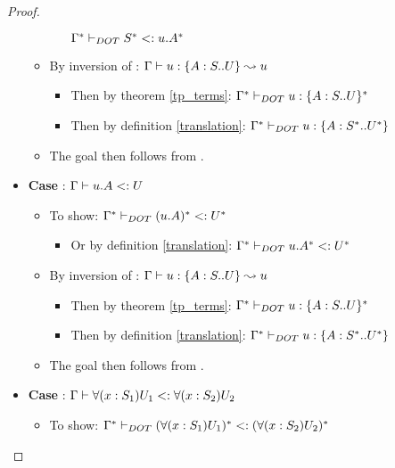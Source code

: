 \begin{proof}
\begin{itemize}
\begin{itemize}
\begin{itemize}
                    $\Gamma^{*} \vdash_{DOT} S^{*} <: u.A^{*}$
            \end{itemize}
            \item By inversion of :
                $\Gamma \vdash u: \{A : S .. U\} \leadsto u$
            \begin{itemize}
                \item Then by theorem \ref{tp_terms}:
                    $\Gamma^{*} \vdash_{DOT} u: \{A : S .. U\}^{*}$
                \item Then by definition \ref{translation}:
                    $\Gamma^{*} \vdash_{DOT} u: \{A : S^{*} .. U^{*}\}$
            \end{itemize}
            \item The goal then follows from .
        \end{itemize}
        \item \textbf{Case} : $\Gamma \vdash u.A <: U$
        \begin{itemize}
            \item To show: $\Gamma^{*} \vdash_{DOT} (u.A)^{*} <: U^{*}$
            \begin{itemize}
                \item Or by definition \ref{translation}:
                    $\Gamma^{*} \vdash_{DOT} u.A^{*} <: U^{*}$
            \end{itemize}
            \item By inversion of :
                $\Gamma \vdash u: \{A : S .. U\} \leadsto u$
            \begin{itemize}
                \item Then by theorem \ref{tp_terms}:
                    $\Gamma^{*} \vdash_{DOT} u: \{A : S .. U\}^{*}$
                \item Then by definition \ref{translation}:
                    $\Gamma^{*} \vdash_{DOT} u: \{A : S^{*} .. U^{*}\}$
            \end{itemize}
            \item The goal then follows from .
        \end{itemize}
        \item \textbf{Case} :
            $\Gamma \vdash \forall(x:S_1)U_1 <: \forall(x:S_2)U_2$
        \begin{itemize}
            \item To show: $\Gamma^{*} \vdash_{DOT} (\forall(x:S_1)U_1)^{*} <: (\forall(x:S_2)U_2)^{*}$

\end{itemize}
\end{itemize}
\end{proof}
